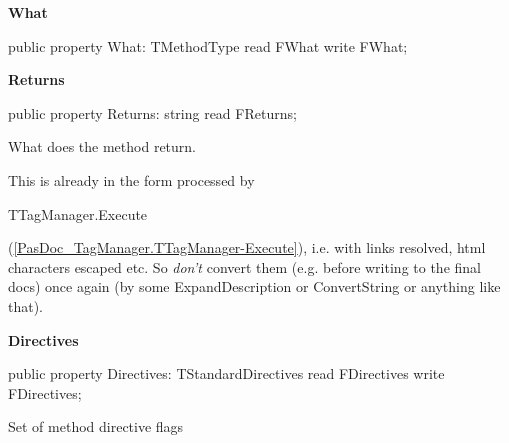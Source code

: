 \documentclass{report}
\newif\ifpdf
\begin{document}
\begin{list}{}{
\setlength{\itemindent}{0cm}
\setlength{\listparindent}{0cm}
\setlength{\leftmargin}{\evensidemargin}
\addtolength{\leftmargin}{\tmplength}
\settowidth{\labelsep}{X}
\addtolength{\leftmargin}{\labelsep}
\setlength{\labelwidth}{\tmplength}
}
\label{PasDoc_Items.TPasMethod-What}
\item[\textbf{What}\hfill]
\ifpdf
\begin{flushleft}
\fi
\begin{ttfamily}
public property What: TMethodType read FWhat write FWhat;\end{ttfamily}

\ifpdf
\end{flushleft}
\fi


\par  \label{PasDoc_Items.TPasMethod-Returns}
\item[\textbf{Returns}\hfill]
\ifpdf
\begin{flushleft}
\fi
\begin{ttfamily}
public property Returns: string read FReturns;\end{ttfamily}

\ifpdf
\end{flushleft}
\fi


\par What does the method return.

This is already in the form processed by \begin{ttfamily}TTagManager.Execute\end{ttfamily}(\ref{PasDoc_TagManager.TTagManager-Execute}), i.e. with links resolved, html characters escaped etc. So \textit{don't} convert them (e.g. before writing to the final docs) once again (by some ExpandDescription or ConvertString or anything like that).\label{PasDoc_Items.TPasMethod-Directives}
\item[\textbf{Directives}\hfill]
\ifpdf
\begin{flushleft}
\fi
\begin{ttfamily}
public property Directives: TStandardDirectives read FDirectives write FDirectives;\end{ttfamily}

\ifpdf
\end{flushleft}
\fi


\par Set of method directive flags\end{list}
\end{document}
